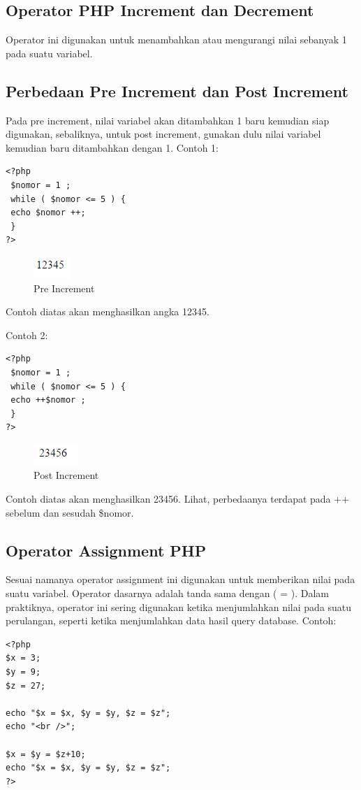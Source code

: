 \subsection{Operator PHP Increment dan Decrement}
Operator ini digunakan untuk menambahkan atau mengurangi nilai sebanyak 1 pada suatu variabel. 
\subsection{Perbedaan Pre Increment dan Post Increment}
Pada pre increment, nilai variabel akan ditambahkan 1 baru kemudian siap digunakan, sebaliknya, untuk  post increment, gunakan dulu nilai variabel kemudian baru ditambahkan dengan 1.
Contoh 1:

\begin{lstlisting}
<?php
 $nomor = 1 ;
 while ( $nomor <= 5 ) {
 echo $nomor ++;
 }
?>
\end{lstlisting}

\begin{figure}[h]
\centering
\includegraphics[scale=1]{figures/pre_increment}
\caption{Pre Increment }
\label{pre}
\end{figure}
Contoh diatas akan menghasilkan angka 12345.

Contoh 2:
\begin{lstlisting}
<?php
 $nomor = 1 ;
 while ( $nomor <= 5 ) {
 echo ++$nomor ;
 }
?>
\end{lstlisting}

\begin{figure}[h]
\centering
\includegraphics[scale=1]{figures/post_increment}
\caption{Post Increment}
\label{post}
\end{figure}

Contoh diatas akan menghasilkan 23456.
Lihat, perbedaanya terdapat pada ++ sebelum dan sesudah \$nomor. 

\subsection{Operator Assignment PHP}
Sesuai namanya operator assignment ini digunakan untuk memberikan nilai pada suatu variabel. Operator dasarnya adalah tanda sama dengan ( = ). Dalam praktiknya, operator ini sering digunakan ketika menjumlahkan nilai pada suatu perulangan, seperti ketika menjumlahkan data hasil query database.
Contoh:
\begin{lstlisting}
<?php
$x = 3;
$y = 9;
$z = 27;
 
echo "$x = $x, $y = $y, $z = $z";
echo "<br />";
 
$x = $y = $z+10;
echo "$x = $x, $y = $y, $z = $z";
?>
\end{lstlisting}


